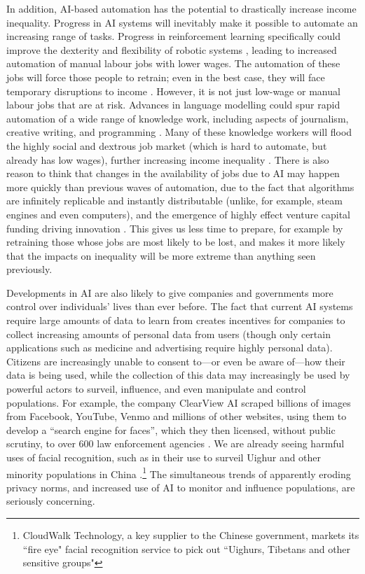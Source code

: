 \documentclass{article}
\begin{document}
In addition, AI-based automation has the potential to drastically increase income inequality. Progress in AI systems will inevitably make it possible to automate an increasing range of tasks. Progress in reinforcement learning specifically could improve the dexterity and flexibility of robotic systems \citep{ibarz_how_2021}, leading to increased automation of manual labour jobs with lower wages. The automation of these jobs will force those people to retrain; even in the best case, they will face temporary disruptions to income \citep{lee_ai_2018}. However, it is not just low-wage or manual labour jobs that are at risk. Advances in language modelling could spur rapid automation of a wide range of knowledge work, including aspects of journalism, creative writing, and programming \citep{tamkin_understanding_2021}. Many of these knowledge workers will flood the highly social and dextrous job market (which is hard to automate, but already has low wages), further increasing income inequality  \citep{lee_ai_2018}. There is also reason to think that changes in the availability of jobs due to AI may happen more quickly than previous waves of automation, due to the fact that algorithms are infinitely replicable and instantly distributable (unlike, for example, steam engines and even computers), and the emergence of highly effect venture capital funding driving innovation  \citep{lee_ai_2018}. This gives us less time to prepare, for example by retraining those whose jobs are most likely to be lost, and makes it more likely that the impacts on inequality will be more extreme than anything seen previously.

Developments in AI are also likely to give companies and governments more control over individuals’ lives than ever before. The fact that current AI systems require large amounts of data to learn from creates incentives for companies to collect increasing amounts of personal data from users (though only certain applications such as medicine and advertising require highly personal data). Citizens are increasingly unable to consent to---or even be aware of---how their data is being used, while the collection of this data may increasingly be used by powerful actors to surveil, influence, and even manipulate and control populations. For example, the company ClearView AI scraped billions of images from Facebook, YouTube, Venmo and millions of other websites, using them to develop a ``search engine for faces'', which they then licensed, without public scrutiny, to over 600 law enforcement agencies \citep{hill_secretive_2020}. We are already seeing harmful uses of facial recognition, such as in their use to surveil Uighur and other minority populations in China  \citep{hogarth_state_2019}.\footnote{CloudWalk Technology, a key supplier to the Chinese government, markets its ``fire eye" facial recognition service to pick out ``Uighurs, Tibetans and other sensitive groups"} The simultaneous trends of apparently eroding privacy norms, and increased use of AI to monitor and influence populations, are seriously concerning.
\end{document}
